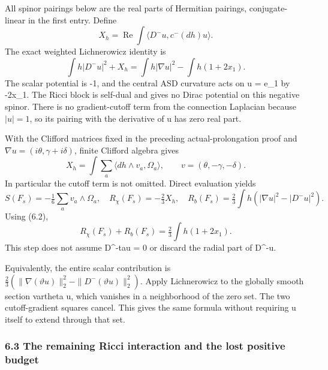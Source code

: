 \documentclass[
  10pt,
]{article}
\begin{document}
All spinor pairings below are the real parts of Hermitian pairings,
conjugate-linear in the first entry. Define \[
 X_h=\operatorname{Re}\int
        \langle D^-u,c^-(dh)u\rangle.
\] The exact weighted Lichnerowicz identity is \[
 \int h|D^-u|^2+X_h
      =\int h|\nabla u|^2-\int h(1+2x_1).                \tag{6.2}
\] The scalar potential is -1, and the central ASD curvature acts on u =
e\_1 by -2x\_1. The Ricci block is self-dual and gives no Dirac
potential on this negative spinor. There is no gradient-cutoff term from
the connection Laplacian because \(|u|=1\), so its pairing with the
derivative of u has zero real part.

With the Clifford matrices fixed in the preceding actual-prolongation
proof and \(\nabla u=(i\theta,\gamma+i\delta)\), finite Clifford algebra
gives \[
 X_h=\int\sum_a\langle dh\wedge v_a,\Omega_a\rangle,
                     \qquad v=(\theta,-\gamma,-\delta).
\] In particular the cutoff term is not omitted. Direct evaluation
yields \[
 S(F_s)=-\tfrac16\sum_a v_a\wedge\Omega_a,
 \quad R_\chi(F_s)=-\tfrac23 X_h,
 \quad R_b(F_s)=\tfrac23\int h(|\nabla u|^2-|D^-u|^2).
\] Using (6.2), \[
 \boxed{R_\chi(F_s)+R_b(F_s)=\tfrac23\int h(1+2x_1).}    \tag{6.3}
\] This step does not assume D\^{}-tau = 0 or discard the radial part of
D\^{}-u.

Equivalently, the entire scalar contribution is
\(\tfrac23(\|\nabla(\vartheta u)\|_2^2 -\|D^-(\vartheta u)\|_2^2)\).
Apply Lichnerowicz to the globally smooth section vartheta u, which
vanishes in a neighborhood of the zero set. The two cutoff-gradient
squares cancel. This gives the same formula without requiring u itself
to extend through that set.

\hypertarget{the-remaining-ricci-interaction-and-the-lost-positive-budget}{%
\subsubsection{6.3 The remaining Ricci interaction and the lost positive
budget}\label{the-remaining-ricci-interaction-and-the-lost-positive-budget}}
\end{document}
